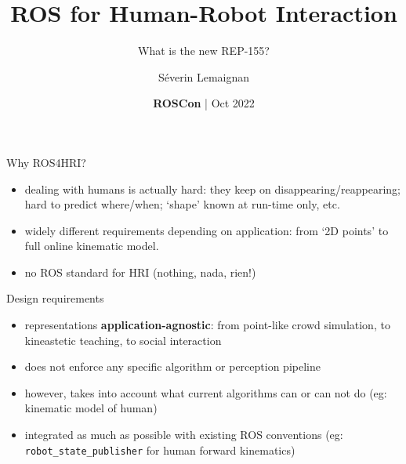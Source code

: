 \documentclass[xcolor=table,aspectratio=169]{beamer}
\title{\Large ROS for Human-Robot Interaction}
\subtitle{What is the new REP-155?}
\date{{\bf ROSCon} | Oct 2022}
\author{Séverin Lemaignan}
\institute{{\bf PAL Robotics} Senior Scientist AI \& Social Interactions}
\begin{document}




\maketitle
{}


%
%
%
%

{
\begin{frame}{Why ROS4HRI?}

    \begin{itemize}
        \item  dealing with humans is actually hard: they keep on disappearing/reappearing; hard to predict where/when; ‘shape’ known at run-time only, etc.

\item widely different requirements depending on application: from ‘2D points’ to full online kinematic model.

    \item no ROS standard for HRI (nothing, nada, rien!)
    \end{itemize}

\end{frame}
}

{
\begin{frame}{Design requirements}

    \begin{itemize}
        \item<1-> representations \textbf{application-agnostic}: from point-like crowd
            simulation, to kineastetic teaching, to social interaction
        \item<2-> does not enforce any specific algorithm or perception pipeline
        \item<3-> however, takes into account what current algorithms can or can not
            do {\footnotesize (eg: kinematic model of human)}
        \item<4-> integrated as much as possible with existing ROS conventions
            {\footnotesize (eg: \texttt{robot\_state\_publisher} for human forward
            kinematics)}
    \end{itemize}
\end{frame}
}
\end{document}
